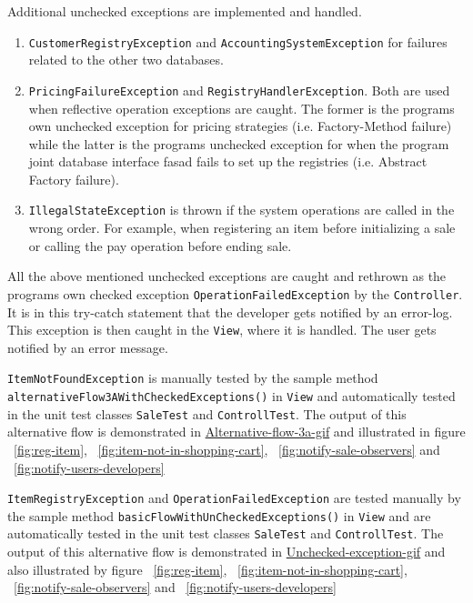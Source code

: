 \documentclass[a4paper]{scrreprt}
\begin{document}
Additional unchecked exceptions are implemented and handled.
\begin{enumerate}
    \item \texttt{CustomerRegistryException} and \texttt{AccountingSystemException} for
    failures related to the other two databases.
    \item \texttt{PricingFailureException} and \texttt{RegistryHandlerException}.
    Both are used when reflective operation exceptions are caught.
    The former is the programs own unchecked exception for pricing strategies
    (i.e. Factory-Method failure) while the latter
    is the programs unchecked exception for
    when the program joint database interface fasad fails to set up the registries
    (i.e. Abstract Factory failure).
    \item \texttt{IllegalStateException} is thrown if the
    system operations are called in the wrong order.
    For example, when registering an item before initializing a sale
    or calling the pay operation before ending sale.
\end{enumerate}

All the above mentioned unchecked exceptions %
are caught and rethrown as the programs own checked
exception \texttt{OperationFailedException}
by the \verb|Controller|.
It is in this try-catch statement that the developer gets notified by an error-log.
This exception is then caught in the \verb|View|, where it is
handled.
The user gets notified by an error message.

\texttt{ItemNotFoundException} is manually tested by the sample method
\texttt{alternativeFlow3AWithCheckedExceptions()}
in \verb|View|
and automatically tested in the unit test classes \verb|SaleTest| and \verb|ControllTest|.
The output of this alternative flow is demonstrated in
\href{https://github.com/VincentFerrigan/kth-iv1350-object-oriented-design#alternative-flow---checked-exception-business-logic}{Alternative-flow-3a-gif}
and illustrated in
figure ~\ref{fig:reg-item}, ~\ref{fig:item-not-in-shopping-cart}, ~\ref{fig:notify-sale-observers} and ~\ref{fig:notify-users-developers}

\texttt{ItemRegistryException} and \texttt{OperationFailedException}
are tested manually
by the sample method \texttt{basicFlowWithUnCheckedExceptions()}
in \verb|View| and are automatically tested in the unit test
classes \verb|SaleTest| and \verb|ControllTest|.
The output of this alternative flow is demonstrated in
\href{https://github.com/VincentFerrigan/kth-iv1350-object-oriented-design#alternative-flow---unchecked-exception}{Unchecked-exception-gif}
and also illustrated by
figure ~\ref{fig:reg-item}, ~\ref{fig:item-not-in-shopping-cart}, ~\ref{fig:notify-sale-observers} and ~\ref{fig:notify-users-developers}
\end{document}
